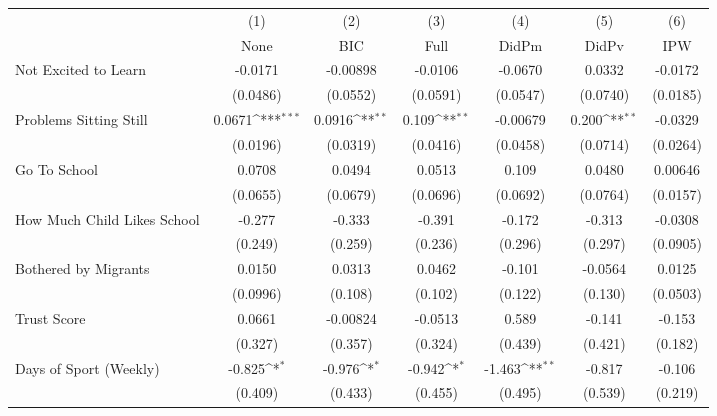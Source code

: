 {
\def\sym#1{\ifmmode^{#1}\else\(^{#1}\)\fi}
\begin{tabular}{l*{6}{c}}
\toprule
            &\multicolumn{1}{c}{(1)}&\multicolumn{1}{c}{(2)}&\multicolumn{1}{c}{(3)}&\multicolumn{1}{c}{(4)}&\multicolumn{1}{c}{(5)}&\multicolumn{1}{c}{(6)}\\
            &\multicolumn{1}{c}{None}&\multicolumn{1}{c}{BIC}&\multicolumn{1}{c}{Full}&\multicolumn{1}{c}{DidPm}&\multicolumn{1}{c}{DidPv}&\multicolumn{1}{c}{IPW}\\
\midrule
Not Excited to Learn&     -0.0171         &    -0.00898         &     -0.0106         &     -0.0670         &      0.0332         &     -0.0172         \\
            &    (0.0486)         &    (0.0552)         &    (0.0591)         &    (0.0547)         &    (0.0740)         &    (0.0185)         \\
\addlinespace
Problems Sitting Still&      0.0671\sym{***}&      0.0916\sym{**} &       0.109\sym{**} &    -0.00679         &       0.200\sym{**} &     -0.0329         \\
            &    (0.0196)         &    (0.0319)         &    (0.0416)         &    (0.0458)         &    (0.0714)         &    (0.0264)         \\
\addlinespace
Go To School&      0.0708         &      0.0494         &      0.0513         &       0.109         &      0.0480         &     0.00646         \\
            &    (0.0655)         &    (0.0679)         &    (0.0696)         &    (0.0692)         &    (0.0764)         &    (0.0157)         \\
\addlinespace
How Much Child Likes School&      -0.277         &      -0.333         &      -0.391         &      -0.172         &      -0.313         &     -0.0308         \\
            &     (0.249)         &     (0.259)         &     (0.236)         &     (0.296)         &     (0.297)         &    (0.0905)         \\
\addlinespace
Bothered by Migrants&      0.0150         &      0.0313         &      0.0462         &      -0.101         &     -0.0564         &      0.0125         \\
            &    (0.0996)         &     (0.108)         &     (0.102)         &     (0.122)         &     (0.130)         &    (0.0503)         \\
\addlinespace
Trust Score &      0.0661         &    -0.00824         &     -0.0513         &       0.589         &      -0.141         &      -0.153         \\
            &     (0.327)         &     (0.357)         &     (0.324)         &     (0.439)         &     (0.421)         &     (0.182)         \\
\addlinespace
Days of Sport (Weekly)&      -0.825\sym{*}  &      -0.976\sym{*}  &      -0.942\sym{*}  &      -1.463\sym{**} &      -0.817         &      -0.106         \\
            &     (0.409)         &     (0.433)         &     (0.455)         &     (0.495)         &     (0.539)         &     (0.219)         \\
\bottomrule
\end{tabular}
}
